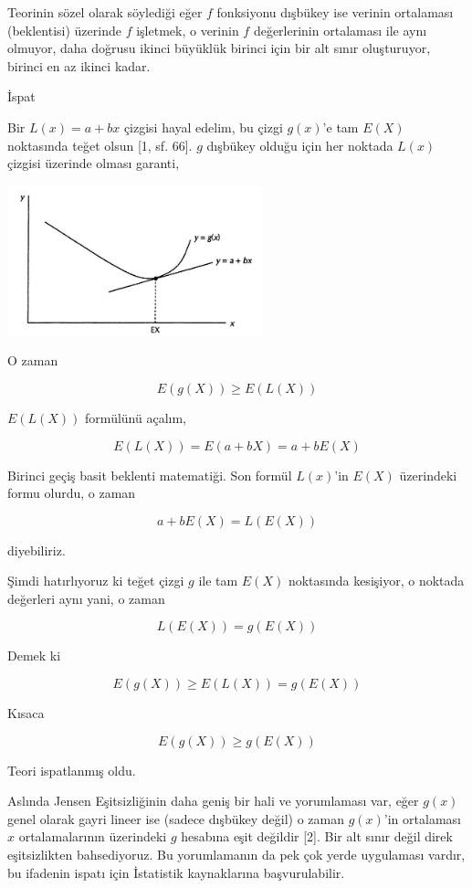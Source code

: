\documentclass[12pt,fleqn]{article}\usepackage{../../common}
\begin{document}
Teorinin sözel olarak söylediği eğer $f$ fonksiyonu dışbükey ise verinin
ortalaması (beklentisi) üzerinde $f$ işletmek, o verinin $f$ değerlerinin
ortalaması ile aynı olmuyor, daha doğrusu ikinci büyüklük birinci için bir
alt sınır oluşturuyor, birinci en az ikinci kadar.

İspat

Bir $L(x) = a + bx$ çizgisi hayal edelim, bu çizgi $g(x)$'e tam $E(X)$
noktasında teğet olsun [1, sf. 66]. $g$ dışbükey olduğu için her noktada
$L(x)$ çizgisi üzerinde olması garanti,

\includegraphics[width=20em]{jensen.jpg}

O zaman

$$
E(g(X)) \ge E(L(X))
$$

$E(L(X))$ formülünü açalım,

$$
E(L(X)) = E(a + bX) = a + bE(X) 
$$

Birinci geçiş basit beklenti matematiği. Son formül $L(x)$'in $E(X)$
üzerindeki formu olurdu, o zaman

$$
a + bE(X) = L(E(X))
$$

diyebiliriz.

Şimdi hatırlıyoruz ki teğet çizgi $g$ ile tam $E(X)$ noktasında kesişiyor, o
noktada değerleri aynı yani, o zaman

$$
L(E(X)) = g(E(X))
$$

Demek ki

$$
E(g(X)) \ge E(L(X)) = g(E(X))
$$

Kısaca

$$
E(g(X)) \ge  g(E(X))
$$

Teori ispatlanmış oldu.

Aslında Jensen Eşitsizliğinin daha geniş bir hali ve yorumlaması var, eğer
$g(x)$ genel olarak gayri lineer ise (sadece dışbükey değil) o zaman $g(x)$'in
ortalaması $x$ ortalamalarının üzerindeki $g$ hesabına eşit değildir [2]. Bir
alt sınır değil direk eşitsizlikten bahsediyoruz. Bu yorumlamanın da pek çok
yerde uygulaması vardır, bu ifadenin ispatı için İstatistik kaynaklarına
başvurulabilir.
\end{document}

